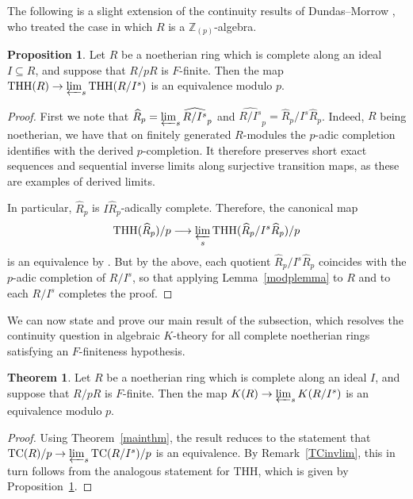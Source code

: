 \documentclass{amsart}
\newcommand{\THH}{\mathrm{THH}}
\theoremstyle{definition}
\newtheorem{proposition}[definition]{Proposition}
\newtheorem{theorem}[definition]{Theorem}
\newcommand{\To}{\longrightarrow}
\renewcommand{\hat}{\widehat}
\newcommand{\TC}{\mathrm{TC}}
\begin{document}
The following is a slight extension of the continuity results of Dundas--Morrow
\cite{DundasMorrow}, who treated the case in which $R$ is a $\mathbb{Z}_{(p)}$-algebra.

\begin{proposition} 
\label{THHcont}
Let $R$ be a noetherian ring which is complete along an ideal $I\subseteq R$, and suppose that 
$R/pR$ is $F$-finite.
Then the map $\THH(R) \to \varprojlim_s \THH(R/I^s)$ is an equivalence modulo $p$.
\end{proposition} 
\begin{proof} 
First we note that $\hat R_p = \varprojlim_s \widehat{R/I^s}_p$ and $\widehat{R/I^s}_p = \hat R_p /I^s\hat R_p$.  Indeed, $R$ being noetherian, we have that on finitely generated $R$-modules the $p$-adic completion identifies with the derived $p$-completion. It therefore preserves short exact sequences and sequential inverse limits along surjective transition maps, as these are examples of derived limits.

In particular, $\hat R_p$ is $I\hat
R_p$-adically complete. Therefore, the canonical map
\[ \THH(\widehat{R}_p)/p \To \varprojlim_s \THH( \widehat{R}_p/I^s
\widehat{R}_p)/p\] is an equivalence by \cite[Thm.~4.5]{DundasMorrow}. But by the above, each quotient $\hat R_p/I^s\hat
R_p$ coincides with the $p$-adic completion of $R/I^s$, so that applying
Lemma~\ref{modplemma} to $R$ and to each $R/I^s $ completes the proof.
\end{proof}

We can now state and prove our main result of the subsection, which resolves the continuity question in algebraic $K$-theory for all complete noetherian rings satisfying an $F$-finiteness hypothesis.

\begin{theorem} 
\label{Kcont}
Let $R$ be a noetherian ring which is complete along an ideal $I$, and suppose that 
$R/pR$ is $F$-finite. Then the map $K(R) \to \varprojlim_s K(R/I^s)$ is an
equivalence modulo $p$. 
\end{theorem} 
\begin{proof} 
Using Theorem~\ref{mainthm}, the result reduces to the
statement that $\TC(R)/p \to \varprojlim_s \TC(R/I^s)/p$ is an equivalence.  By Remark~\ref{TCinvlim}, this in turn follows from the analogous statement for $\THH$, which is given by Proposition~\ref{THHcont}. 
\end{proof} 
\end{document}
